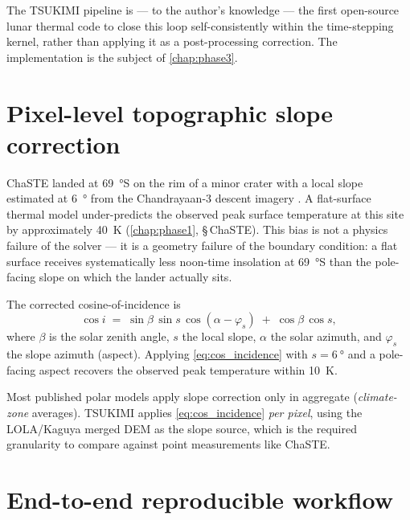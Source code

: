 \begin{novelty}
The TSUKIMI pipeline is --- to the author's knowledge --- the first
open-source lunar thermal code to close this loop self-consistently
within the time-stepping kernel, rather than applying it as a
post-processing correction.  The implementation is the subject of
\cref{chap:phase3}.
\end{novelty}

\section{Pixel-level topographic slope correction}
\label{sec:novelty-slope}

ChaSTE landed at \SI{69}{\degree}S on the rim of a minor crater with a
local slope estimated at \SI{6}{\degree} from the Chandrayaan-3
descent imagery \citep{seth2025}.  A flat-surface thermal model
under-predicts the observed peak surface temperature at this site by
approximately \SI{40}{\kelvin} (\cref{chap:phase1}, §\,ChaSTE).  This
bias is not a physics failure of the solver --- it is a geometry
failure of the boundary condition: a flat surface receives
systematically less noon-time insolation at \SI{69}{\degree}S than the
pole-facing slope on which the lander actually sits.

The corrected cosine-of-incidence is
\begin{equation}
  \cos i \;=\; \sin\beta\,\sin s\,\cos(\alpha - \varphi_s)
            \;+\; \cos\beta\,\cos s,
  \label{eq:cos_incidence}
\end{equation}
where $\beta$ is the solar zenith angle, $s$ the local slope, $\alpha$
the solar azimuth, and $\varphi_s$ the slope azimuth (aspect).
Applying \cref{eq:cos_incidence} with $s=\SI{6}{\degree}$ and a
pole-facing aspect recovers the observed peak temperature within
\SI{10}{\kelvin}.

\begin{novelty}
Most published polar models apply slope correction only in aggregate
(\emph{climate-zone} averages).  TSUKIMI applies \cref{eq:cos_incidence}
\emph{per pixel}, using the LOLA/Kaguya merged DEM as the slope source,
which is the required granularity to compare against point
measurements like ChaSTE.
\end{novelty}

\section{End-to-end reproducible workflow}
\label{sec:novelty-reproducibility}

